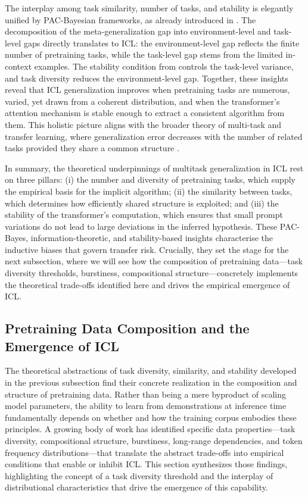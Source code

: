 \documentclass[11pt]{article}
\begin{document}
The interplay among task similarity, number of tasks, and stability is elegantly unified by PAC-Bayesian frameworks, as already introduced in \cite{ref22}. The decomposition of the meta-generalization gap into environment-level and task-level gaps directly translates to ICL: the environment-level gap reflects the finite number of pretraining tasks, while the task-level gap stems from the limited in-context examples. The stability condition from \cite{ref4} controls the task-level variance, and task diversity reduces the environment-level gap. Together, these insights reveal that ICL generalization improves when pretraining tasks are numerous, varied, yet drawn from a coherent distribution, and when the transformer's attention mechanism is stable enough to extract a consistent algorithm from them. This holistic picture aligns with the broader theory of multi-task and transfer learning, where generalization error decreases with the number of related tasks provided they share a common structure \cite{ref27,ref30}.

In summary, the theoretical underpinnings of multitask generalization in ICL rest on three pillars: (i) the number and diversity of pretraining tasks, which supply the empirical basis for the implicit algorithm; (ii) the similarity between tasks, which determines how efficiently shared structure is exploited; and (iii) the stability of the transformer's computation, which ensures that small prompt variations do not lead to large deviations in the inferred hypothesis. These PAC-Bayes, information-theoretic, and stability-based insights characterise the inductive biases that govern transfer risk. Crucially, they set the stage for the next subsection, where we will see how the composition of pretraining data---task diversity thresholds, burstiness, compositional structure---concretely implements the theoretical trade-offs identified here and drives the empirical emergence of ICL.

\subsection{Pretraining Data Composition and the Emergence of ICL}

The theoretical abstractions of task diversity, similarity, and stability developed in the previous subsection find their concrete realization in the composition and structure of pretraining data. Rather than being a mere byproduct of scaling model parameters, the ability to learn from demonstrations at inference time fundamentally depends on whether and how the training corpus embodies these principles. A growing body of work has identified specific data properties---task diversity, compositional structure, burstiness, long-range dependencies, and token frequency distributions---that translate the abstract trade-offs into empirical conditions that enable or inhibit ICL. This section synthesizes those findings, highlighting the concept of a task diversity threshold and the interplay of distributional characteristics that drive the emergence of this capability.
\end{document}
